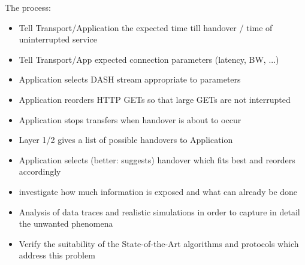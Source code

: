 The process:
\begin{itemize}
\item Tell Transport/Application the expected time till handover / time of uninterrupted service
\item Tell Transport/App expected connection parameters (latency, BW, ...)
\item Application selects \gls{DASH} stream appropriate to parameters
\item Application reorders \gls{HTTP} GETs so that large GETs are not interrupted
\item Application stops transfers when handover is about to occur
\item Layer 1/2 gives a list of possible handovers to Application
\item Application selects (better: suggests) handover which fits best and reorders accordingly
\end{itemize}


\begin{itemize}
	\item investigate how much information is exposed and what can already be done
	\item Analysis of data traces and realistic simulations in order to capture in detail the unwanted phenomena
	\item Verify the suitability of the State-of-the-Art algorithms and protocols which address this problem
\end{itemize}


